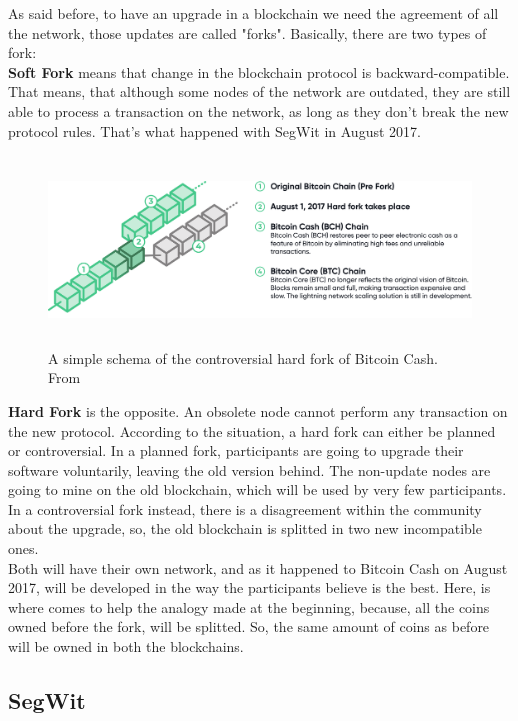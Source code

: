 As said before, to have an upgrade in a blockchain we need the agreement of all
the network, those updates are called "forks". Basically, there are two types 
of fork:
\bigskip\\
\textbf{Soft Fork}
means that change in the blockchain protocol is backward-compatible. That means,
that although some nodes of the network are outdated, they are still able to 
process a transaction on the network, as long as they don't break the new protocol rules.
That's what happened with SegWit in August 2017.
\bigskip\\
\begin{figure}
    \centering
    \includegraphics[height=5cm]{fork-img.png}
    \caption{A simple schema of the controversial hard fork of Bitcoin Cash. From \cite{bitcoin.com}}
    \label{fig:hardfork}
\end{figure}
\textbf{Hard Fork}
is the opposite. An obsolete node cannot perform any transaction on the new protocol.
According to the situation, a hard fork can either be planned or controversial.
In a planned fork, participants are going to upgrade their software voluntarily,
leaving the old version behind. The non-update nodes are going to mine on the old 
blockchain, which will be used by very few participants.\\
In a controversial fork instead, there is a disagreement within the community about
the upgrade, so, the old blockchain is splitted in two new incompatible ones.\\ 
Both will have their own network, and as it happened to Bitcoin Cash on August 2017, 
will be developed in the way the participants believe is the best. Here, is where 
comes to help the analogy made at the beginning, because, all the coins owned before 
the fork, will be splitted. So, the same amount of coins as before will be owned in 
both the blockchains.\cite{binancevision}


\subsection{SegWit}
\label{sec:segwit}

